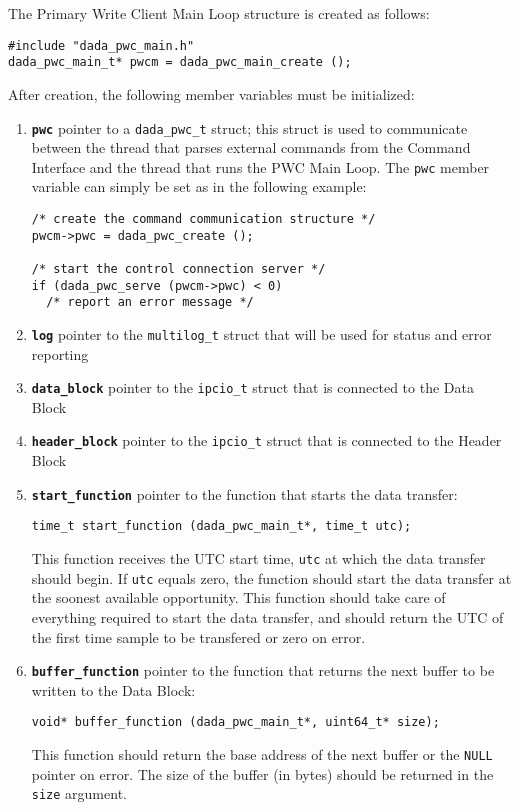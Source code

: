 The Primary Write Client Main Loop structure is created as follows:
\begin{verbatim}
#include "dada_pwc_main.h"
dada_pwc_main_t* pwcm = dada_pwc_main_create ();
\end{verbatim}
After creation, the following member variables must be initialized:
\begin{enumerate}

\item {\bf {\tt pwc}} pointer to a {\tt dada\_pwc\_t} struct; 
   this struct is used to communicate between the thread that parses
   external commands from the Command Interface and the thread that
   runs the PWC Main Loop.  The {\tt pwc} member variable can simply
   be set as in the following example:
\begin{verbatim}
/* create the command communication structure */
pwcm->pwc = dada_pwc_create ();

/* start the control connection server */
if (dada_pwc_serve (pwcm->pwc) < 0)
  /* report an error message */
\end{verbatim}

\item {\bf {\tt log}} pointer to the {\tt multilog\_t} struct
	that will be used for status and error reporting

\item {\bf {\tt data\_block}} pointer to the {\tt ipcio\_t} struct 
	that is connected to the Data Block

\item {\bf {\tt header\_block}} pointer to the {\tt ipcio\_t} struct
	that is connected to the Header Block

\item {\bf {\tt start\_function}} pointer to the function that starts the 
  data transfer:
\begin{verbatim}
time_t start_function (dada_pwc_main_t*, time_t utc);
\end{verbatim}
  This function receives the UTC start time, {\tt utc} at which the
  data transfer should begin.  If {\tt utc} equals zero, the function
  should start the data transfer at the soonest available opportunity.
  This function should take care of everything required to start the
  data transfer, and should return the UTC of the first time sample to
  be transfered or zero on error.

\item {\bf {\tt buffer\_function}} pointer to the function that returns
  the next buffer to be written to the Data Block:
\begin{verbatim}
void* buffer_function (dada_pwc_main_t*, uint64_t* size);
\end{verbatim}
  This function should return the base address of the next buffer or
  the {\tt NULL} pointer on error.  The size of the buffer (in bytes)
  should be returned in the {\tt size} argument.


\end{enumerate}
